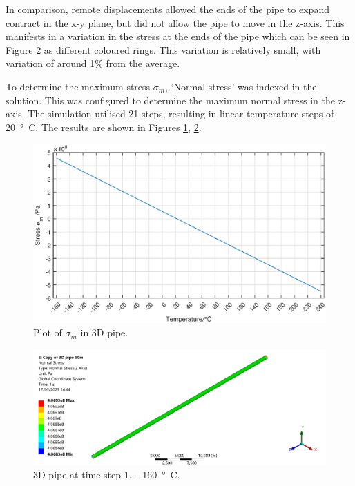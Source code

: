 In comparison, remote displacements allowed the ends of the pipe to expand contract in the x-y plane, but did not allow the pipe to move in the z-axis. This manifests in a variation in the stress at the ends of the pipe which can be seen in Figure \ref{part1c2} as different coloured rings. This variation is relatively small, with variation of around 1\% from the average.

To determine the maximum stress $\sigma_m$, `Normal stress' was indexed in the solution. This was configured to determine the maximum normal stress in the z-axis. The simulation utilised 21 steps, resulting in linear temperature steps of \SI{20}{\degree C}. The results are shown in Figures \ref{part1cSimResults}, \ref{part1c2}.
\begin{figure}[H]
    \centering
    \includegraphics[width = \textwidth]{img/part1ci.eps}
    \caption{Plot of $\sigma_m$ in 3D pipe.}
    \label{part1cSimResults}
\end{figure}
\begin{figure}[H]
    \centering
    \includegraphics[width=\textwidth]{img/part1c-neg160-2.png}
    \caption{3D pipe at time-step 1, \SI{-160}{\degree C}.}
    \label{part1c2}
\end{figure}%
